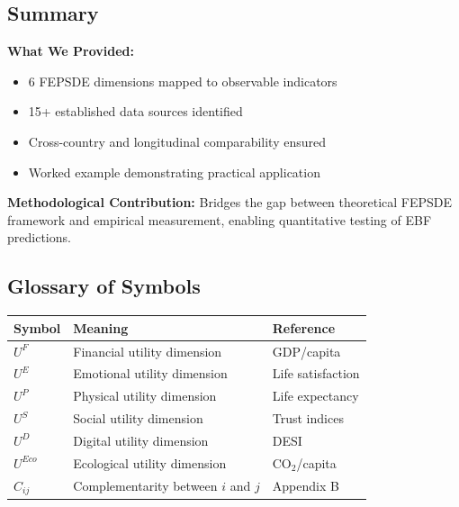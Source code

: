

\subsection{Summary}
\label{sec:E-summary}

\begin{tcolorbox}[colback=blue!5!white, colframe=blue!75!black,
    title=\textbf{Summary: Operationalization}]

\textbf{What We Provided:}
\begin{itemize}[nosep]
    \item 6 FEPSDE dimensions mapped to observable indicators
    \item 15+ established data sources identified
    \item Cross-country and longitudinal comparability ensured
    \item Worked example demonstrating practical application
\end{itemize}

\textbf{Methodological Contribution:}
Bridges the gap between theoretical FEPSDE framework and empirical measurement,
enabling quantitative testing of EBF predictions.

\end{tcolorbox}


\subsection{Glossary of Symbols}
\label{sec:E-glossary}

\begin{center}
\begin{tabular}{@{}lll@{}}
\toprule
\textbf{Symbol} & \textbf{Meaning} & \textbf{Reference} \\
\midrule
$U^F$ & Financial utility dimension & GDP/capita \\
$U^E$ & Emotional utility dimension & Life satisfaction \\
$U^P$ & Physical utility dimension & Life expectancy \\
$U^S$ & Social utility dimension & Trust indices \\
$U^D$ & Digital utility dimension & DESI \\
$U^{Eco}$ & Ecological utility dimension & CO$_2$/capita \\
$C_{ij}$ & Complementarity between $i$ and $j$ & Appendix B \\
\bottomrule
\end{tabular}
\end{center}

